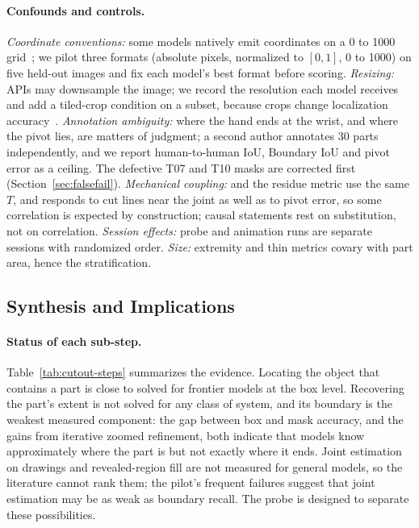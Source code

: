 \paragraph{Confounds and controls.} \emph{Coordinate conventions:} some models natively emit coordinates on a 0 to 1000 grid~\citep{hamdi2026llmseg}; we pilot three formats (absolute pixels, normalized to $[0,1]$, 0 to 1000) on five held-out images and fix each model's best format before scoring. \emph{Resizing:} APIs may downsample the image; we record the resolution each model receives and add a tiled-crop condition on a subset, because crops change localization accuracy~\citep{li2025screenspotpro,zhang2025wheretolook}. \emph{Annotation ambiguity:} where the hand ends at the wrist, and where the pivot lies, are matters of judgment; a second author annotates 30 parts independently, and we report human-to-human IoU, Boundary IoU and pivot error as a ceiling. The defective T07 and T10 masks are corrected first (Section~\ref{sec:falsefail}). \emph{Mechanical coupling:}  and the residue metric use the same $T$, and  responds to cut lines near the joint as well as to pivot error, so some correlation is expected by construction; causal statements rest on substitution, not on correlation. \emph{Session effects:} probe and animation runs are separate sessions with randomized order. \emph{Size:} extremity and thin metrics covary with part area, hence the stratification.

\subsection{Synthesis and Implications}
\label{sec:cutout-synthesis}

\paragraph{Status of each sub-step.} Table~\ref{tab:cutout-steps} summarizes the evidence. Locating the object that contains a part is close to solved for frontier models at the box level. Recovering the part's extent is not solved for any class of system, and its boundary is the weakest measured component: the gap between box and mask accuracy, and the gains from iterative zoomed refinement, both indicate that models know approximately where the part is but not exactly where it ends. Joint estimation on drawings and revealed-region fill are not measured for general models, so the literature cannot rank them; the pilot's frequent  failures suggest that joint estimation may be as weak as boundary recall. The probe is designed to separate these possibilities.

